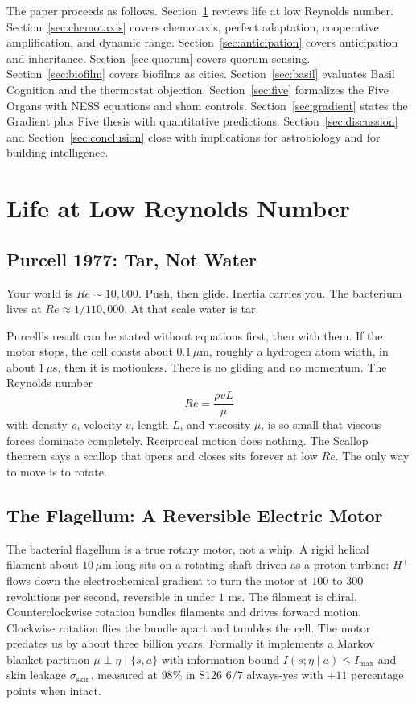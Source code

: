 \documentclass[11pt,a4paper]{article}
\begin{document}
The paper proceeds as follows. Section~\ref{sec:lowre} reviews life at low Reynolds number. Section~\ref{sec:chemotaxis} covers chemotaxis, perfect adaptation, cooperative amplification, and dynamic range. Section~\ref{sec:anticipation} covers anticipation and inheritance. Section~\ref{sec:quorum} covers quorum sensing. Section~\ref{sec:biofilm} covers biofilms as cities. Section~\ref{sec:basil} evaluates Basil Cognition and the thermostat objection. Section~\ref{sec:five} formalizes the Five Organs with NESS equations and sham controls. Section~\ref{sec:gradient} states the Gradient plus Five thesis with quantitative predictions. Section~\ref{sec:discussion} and Section~\ref{sec:conclusion} close with implications for astrobiology and for building intelligence.

\section{Life at Low Reynolds Number}
\label{sec:lowre}

\subsection{Purcell 1977: Tar, Not Water}

Your world is $Re \sim 10{,}000$. Push, then glide. Inertia carries you. The bacterium lives at $Re \approx 1/110{,}000$. At that scale water is tar.

Purcell's result can be stated without equations first, then with them. If the motor stops, the cell coasts about $0.1\,\mu$m, roughly a hydrogen atom width, in about $1\,\mu$s, then it is motionless. There is no gliding and no momentum. The Reynolds number
\begin{equation}
Re = \frac{\rho v L}{\mu}
\end{equation}
with density $\rho$, velocity $v$, length $L$, and viscosity $\mu$, is so small that viscous forces dominate completely. Reciprocal motion does nothing. The Scallop theorem says a scallop that opens and closes sits forever at low $Re$. The only way to move is to rotate.

\subsection{The Flagellum: A Reversible Electric Motor}

The bacterial flagellum is a true rotary motor, not a whip. A rigid helical filament about $10\,\mu$m long sits on a rotating shaft driven as a proton turbine: $H^+$ flows down the electrochemical gradient to turn the motor at $100$ to $300$ revolutions per second, reversible in under $1$ ms. The filament is chiral. Counterclockwise rotation bundles filaments and drives forward motion. Clockwise rotation flies the bundle apart and tumbles the cell. The motor predates us by about three billion years. Formally it implements a Markov blanket partition $\mu \perp \eta \mid \{s,a\}$ with information bound $I(s;\eta \mid a) \leq I_{\max}$ and skin leakage $\sigma_{\text{skin}}$, measured at $98\%$ in S126 $6/7$ always-yes with $+11$ percentage points when intact.
\end{document}
